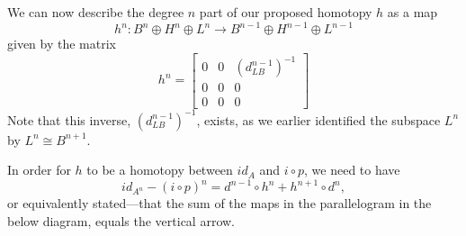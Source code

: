 We can now describe the degree $n$ part of our proposed homotopy $h$ as a map 
\begin{equation*}
    h^n\colon B^n\oplus H^n\oplus L^n \longrightarrow B^{n-1}\oplus H^{n-1}\oplus L^{n-1} 
\end{equation*}
given by the matrix 
\begin{equation*}
h^n = 
\begin{bmatrix}
0 & 0 & (d_{LB}^{n-1})^{-1}\\
0 & 0 & 0\\
0 & 0 & 0
\end{bmatrix}
\end{equation*}
Note that this inverse, $(d_{LB}^{n-1})^{-1}$, exists, as we earlier identified the subspace $L^n$ by $L^n \cong B^{n+1}$. 

In order for $h$ to be a homotopy between $id_A$ and $i\circ p$, we need to have 
\begin{equation*}
    id_{A^n} - (i\circ p)^n = d^{n-1}\circ h^{n} + h^{n+1}\circ d^n, 
\end{equation*}
or equivalently stated---that the sum of the maps in the parallelogram in the below diagram, equals the vertical arrow. 
\begin{center}
\end{center}

